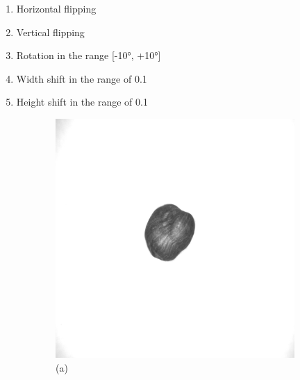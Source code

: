 \documentclass[12pt,DIV14,BCOR12mm,a4paper,footinclude=false,headinclude,parskip=half-,twoside,openright,cleardoublepage=empty,toc=index,bibliography=totoc,listof=totoc]{scrreprt}
\numberwithin{equation}{chapter}
\begin{document}
\begin{enumerate}
    \item Horizontal flipping
    \item Vertical flipping
    \item Rotation in the range [-10°, +10°]
    \item Width shift in the range of 0.1
    \item Height shift in the range of 0.1
\end{enumerate}
\begin{figure}
    \centering
    \begin{subfigure}[b]{0.45\textwidth}
        \centering
        \includegraphics[scale=0.15]{../media/Original1.png} %
        \caption*{(a)}
    \end{subfigure}
    \hfill
    \begin{subfigure}[b]{0.45\textwidth}
        \centering

\end{subfigure}
\end{figure}
\end{document}
